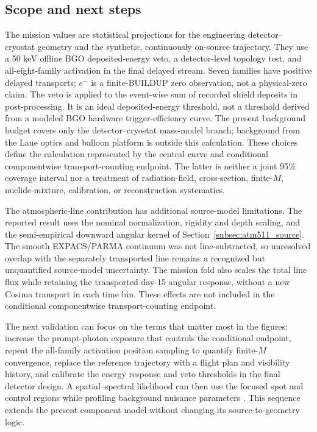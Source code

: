\documentclass[11pt]{article}
\begin{document}
\subsection{Scope and next steps}
\label{subsec:limitations}

The mission values are statistical projections for the engineering
detector--cryostat geometry and the synthetic, continuously on-source trajectory.
They use a 50 keV offline BGO deposited-energy veto, a detector-level topology
test, and all-eight-family activation in
the final delayed stream. Seven families have positive delayed transports; $e^-$
is a finite-BUILDUP zero observation, not a physical-zero claim. The veto is
applied to the event-wise sum of recorded shield deposits in post-processing.
It is an ideal deposited-energy threshold, not a threshold derived from a modeled
BGO hardware trigger-efficiency curve. The present background budget covers only
the detector--cryostat mass-model branch; background from the Laue optics and
balloon platform is outside this calculation. These choices define the calculation
represented by the central curve and conditional componentwise transport-counting
endpoint. The latter is neither a joint 95\% coverage interval nor a treatment
of radiation-field, cross-section, finite-$M$, nuclide-mixture, calibration, or
reconstruction systematics.

The atmospheric-line contribution has additional source-model limitations. The
reported result uses the nominal normalization, rigidity and depth scaling, and
the semi-empirical downward angular kernel of Section~\ref{subsec:atm511_source}.
The smooth EXPACS/PARMA continuum was not line-subtracted, so unresolved overlap
with the separately transported line remains a recognized but unquantified
source-model uncertainty. The mission fold also
scales the total line flux while retaining the transported day-15 angular
response, without a new Cosima transport in each time bin. These effects are not
included in the conditional componentwise transport-counting endpoint.

The next validation can focus on the terms that matter most in the figures: increase
the prompt-photon exposure that controls the conditional endpoint, repeat the
all-family activation position sampling to quantify finite-$M$ convergence, replace the reference trajectory
with a flight plan and visibility history, and calibrate the energy response and veto
thresholds in the final detector design. A spatial--spectral likelihood can then use
the focused spot and control regions while profiling background nuisance parameters
\cite{Cowan2011}. This sequence extends the present component model without
changing its source-to-geometry logic.
\end{document}
